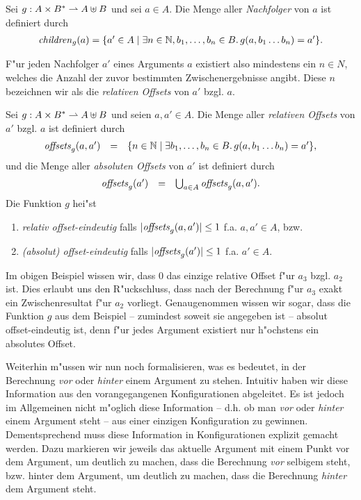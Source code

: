 \documentclass[12pt,a4paper]{article}
\begin{document}
\begin{definition}[Nachfolger]
  Sei $g: A \times B^* \rightharpoonup A \uplus B$ und sei $a \in A$. Die Menge aller \emph{Nachfolger} von $a$ ist
  definiert durch
  \[\begin{array}{rcl}
    \mathit{children}_g(a) = \{a' \in A \mid \exists n \in \mathbb N,b_1,\ldots,b_n \in B.\,g(a,b_1 \ldots b_n) = a'\}.
  \end{array}\]
\end{definition}

F"ur jeden Nachfolger $a'$ eines Arguments $a$ existiert also mindestens ein $n \in N$, welches die Anzahl
der zuvor bestimmten Zwischenergebnisse angibt. Diese $n$ bezeichnen wir als die \emph{relativen Offsets}
von $a'$ bzgl. $a$.

\begin{definition}
  Sei $g: A \times B^* \rightharpoonup A \uplus B$ und seien $a,a' \in A$. Die Menge aller \emph{relativen Offsets}
  von $a'$ bzgl. $a$ ist definiert durch
  \[\begin{array}{rcl}
    \mathit{offsets}_g(a,a') &=& \{n \in \mathbb N \mid \exists b_1,\ldots,b_n \in B.\, g(a,b_1 \ldots b_n) = a'\},
  \end{array}\]
  und die Menge aller \emph{absoluten Offsets} von $a'$ ist definiert durch
  \[\begin{array}{rcl}
    \mathit{offsets}_g(a') &=& \bigcup_{a \in A} \mathit{offsets}_g(a,a').
  \end{array}\]
  Die Funktion $g$ hei"st
  \begin{enumerate}
  \item \emph{relativ offset-eindeutig} falls $|\mathit{offsets}_g(a,a')| \le 1$ f.a. $a,a' \in A$, bzw.
  \item \emph{(absolut) offset-eindeutig} falls $|\mathit{offsets}_g(a')| \le 1$ f.a. $a' \in A$.
  \end{enumerate}
\end{definition}

Im obigen Beispiel wissen wir, dass $0$ das einzige relative Offset f"ur $a_3$ bzgl. $a_2$ ist. Dies
erlaubt uns den R"uckschluss, dass nach der Berechnung f"ur $a_3$ exakt ein Zwischenresultat f"ur
$a_2$ vorliegt. Genaugenommen wissen wir sogar, dass die Funktion $g$ aus dem Beispiel -- zumindest
soweit sie angegeben ist -- absolut offset-eindeutig ist, denn f"ur jedes Argument existiert
nur h"ochstens ein absolutes Offset.

Weiterhin m"ussen wir nun noch formalisieren, was es bedeutet, in der Berechnung \emph{vor} oder
\emph{hinter} einem Argument zu stehen. Intuitiv haben wir diese Information aus den vorangegangenen
Konfigurationen abgeleitet. Es ist jedoch im Allgemeinen nicht m"oglich diese Information -- d.h.
ob man \emph{vor} oder \emph{hinter} einem Argument steht -- aus einer einzigen Konfiguration zu
gewinnen. Dementsprechend muss diese Information in Konfigurationen explizit gemacht werden. Dazu
markieren wir jeweils das aktuelle Argument mit einem Punkt vor dem Argument, um deutlich zu machen,
dass die Berechnung \emph{vor} selbigem steht, bzw. hinter dem Argument, um deutlich zu machen, dass
die Berechnung \emph{hinter} dem Argument steht.
\end{document}
